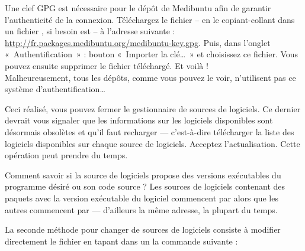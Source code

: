 {\begin{itemize}
\end{itemize}\par
Une clef GPG est nécessaire pour le dépôt de Medibuntu afin de garantir l'authenticité de la connexion. Téléchargez le fichier  -- en le copiant-collant dans un fichier , si besoin est -- à l'adresse suivante : \url{http://fr.packages.medibuntu.org/medibuntu-key.gpg}. Puis, dans l'onglet «~Authentification~» : bouton «~Importer la clé\ldots{}~» et choisissez ce fichier. Vous pouvez ensuite supprimer le fichier téléchargé. Et voilà !\\
Malheureusement, tous les dépôts, comme vous pouvez le voir, n'utilisent pas ce système d'authentification\ldots{}\par
Ceci réalisé, vous pouvez fermer le gestionnaire de sources de logiciels. Ce dernier devrait vous signaler que les informations sur les logiciels disponibles sont désormais obsolètes et qu'il faut recharger --- c'est-à-dire télécharger la liste des logiciels disponibles sur chaque source de logiciels. Acceptez l'actualisation. Cette opération peut prendre du temps.\par
\begin{nota}
Comment savoir si la source de logiciels propose des versions exécutables du programme désiré ou son code source ? Les sources de logiciels contenant des paquets avec la version exécutable du logiciel commencent par  alors que les autres commencent par  --- d'ailleurs la même adresse, la plupart du temps.
\end{nota}
La seconde méthode pour changer de sources de logiciels consiste à modifier directement le fichier  en tapant dans un  la commande suivante : \\
}
